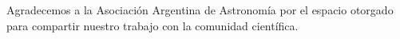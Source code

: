 \documentclass[baaa]{baaa}
\begin{document}






\begin{acknowledgement}
Agradecemos a la Asociación Argentina de Astronomía por el espacio otorgado para compartir nuestro trabajo con la comunidad científica. 
\end{acknowledgement}
\end{document}
